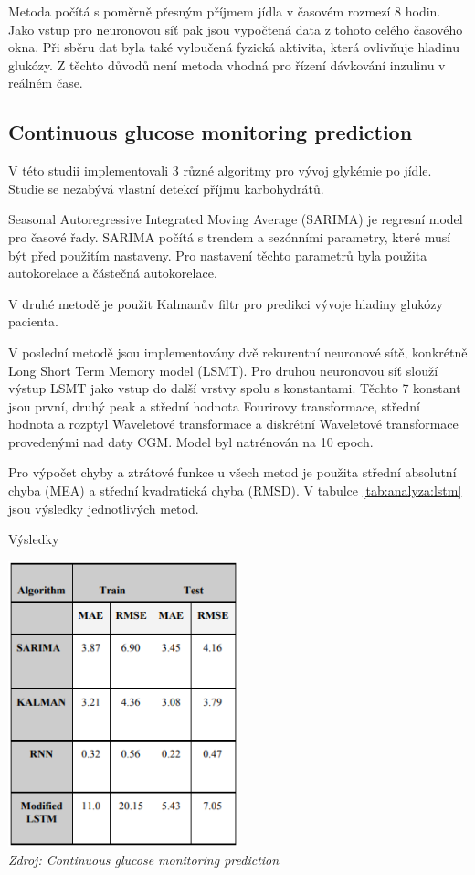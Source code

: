 Metoda počítá s poměrně přesným příjmem jídla v časovém rozmezí 8 hodin. Jako vstup pro neuronovou síť pak jsou vypočtená data z tohoto celého časového okna. Při sběru dat byla také vyloučená fyzická aktivita, která ovlivňuje hladinu glukózy. Z těchto důvodů není metoda vhodná pro řízení dávkování inzulinu v reálném čase.


\subsection{Continuous glucose monitoring prediction}

V této studii \citet{analyzaCHO.LSTM} implementovali 3 různé algoritmy pro vývoj glykémie po jídle. Studie se nezabývá vlastní detekcí příjmu karbohydrátů.

Seasonal Autoregressive Integrated Moving Average (SARIMA) je regresní model pro časové řady. SARIMA počítá s trendem a sezónními parametry, které musí být před použitím nastaveny. Pro nastavení těchto parametrů byla použita autokorelace a částečná autokorelace.

V druhé metodě je použit Kalmanův filtr pro predikci vývoje hladiny glukózy pacienta.

V poslední metodě jsou implementovány dvě rekurentní neuronové sítě, konkrétně Long Short Term Memory model (LSMT). Pro druhou neuronovou síť slouží výstup LSMT jako vstup do další vrstvy spolu s konstantami. Těchto 7 konstant jsou první, druhý peak a střední hodnota Fourirovy transformace, střední hodnota a rozptyl Waveletové transformace a diskrétní Waveletové transformace provedenými nad daty CGM. Model byl natrénován na 10 epoch.

Pro výpočet chyby a ztrátové funkce u všech metod je použita střední absolutní chyba (MEA) a střední kvadratická chyba (RMSD). V tabulce \ref{tab:analyza:lstm} jsou výsledky jednotlivých metod.

\begin{table}[H]
\caption{Výsledky}
\label{tab:analyza:lstm}
\centering
\includegraphics[width=0.5\textwidth]{img/analyzaCHO/lstm.png}\\
\textit{Zdroj: Continuous glucose monitoring prediction \citep{analyzaCHO.LSTM}}
\end{table}

